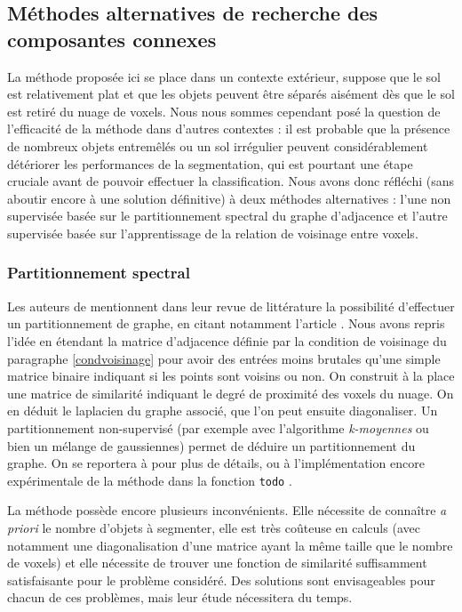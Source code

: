 \documentclass[a4paper, onecolumn, 11pt]{article}
\newcommand{\TODO}{\fbox{\textcolor{red}{TODO}}}
\begin{document}
\subsection{Méthodes alternatives de recherche des composantes connexes}
La méthode proposée ici se place dans un contexte extérieur, suppose que le sol est relativement plat et que les objets  peuvent être séparés aisément dès que le sol est retiré du nuage de voxels. Nous nous sommes cependant posé la question de l'efficacité de la méthode dans d'autres contextes : il est probable que la présence de nombreux objets entremêlés ou un sol irrégulier peuvent considérablement détériorer les performances de la segmentation, qui est pourtant une étape cruciale avant de pouvoir effectuer la classification. Nous avons donc réfléchi (sans aboutir encore à une solution définitive) à deux méthodes alternatives : l'une non supervisée basée sur le partitionnement spectral du graphe d'adjacence et l'autre supervisée basée sur l'apprentissage de la relation de voisinage entre voxels.

\subsubsection{Partitionnement spectral}
Les auteurs de \cite{aka_article} mentionnent dans leur revue de littérature la possibilité d'effectuer un partitionnement de graphe, en citant notamment l'article \cite{mincut}. Nous avons repris l'idée en étendant la matrice d'adjacence définie par la condition de voisinage du paragraphe \ref{condvoisinage} pour avoir des entrées moins brutales qu'une simple matrice binaire indiquant si les points sont voisins ou non. On construit à la place une matrice de similarité indiquant le degré de proximité des voxels du nuage. On en déduit le laplacien du graphe associé, que l'on peut ensuite diagonaliser. Un partitionnement non-supervisé (par exemple avec l'algorithme \emph{k-moyennes} ou bien un mélange de gaussiennes) permet de déduire un partitionnement du graphe. On se reportera à \cite{spectralclustering} pour plus de détails, ou à l'implémentation encore expérimentale de la méthode dans la fonction \texttt{todo} \TODO.

La méthode possède encore plusieurs inconvénients. Elle nécessite de connaître \emph{a priori} le nombre d'objets à segmenter, elle est très coûteuse en calculs (avec notamment une diagonalisation d'une matrice ayant la même taille que le nombre de voxels) et elle nécessite de trouver une fonction de similarité suffisamment satisfaisante pour le problème considéré. Des solutions sont envisageables pour chacun de ces problèmes, mais leur étude nécessitera du temps.
\end{document}
